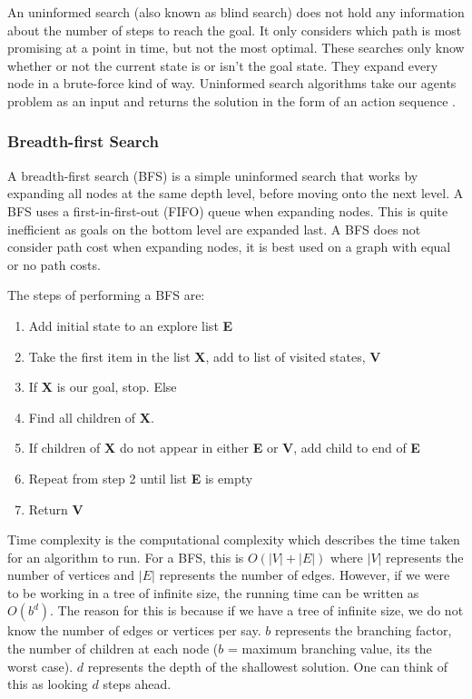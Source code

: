 \documentclass[]{final_report}
\begin{document}
An uninformed search (also known as blind search) does not hold any information about the number of steps to reach the goal. It only considers which path is most promising at a point in time, but not the most optimal\cite{pathak2018comparative}. These searches only know whether or not the current state is or isn't the goal state. They expand every node in a brute-force kind of way. Uninformed search algorithms take our agents problem as an input and returns the solution in the form of an action sequence \cite{russell2016artificial}.

\subsubsection{Breadth-first Search}\label{Breadth-first Search}

A breadth-first search (BFS) is a simple uninformed search that works by expanding all nodes at the same depth level, before moving onto the next level. A BFS uses a first-in-first-out (FIFO) queue when expanding nodes. This is quite inefficient as goals on the bottom level are expanded last. A BFS does not consider path cost when expanding nodes, it is best used on a graph with equal or no path costs.

The steps of performing a BFS are:

\begin{enumerate}
    \item Add initial state to an explore list \textbf{E}
    \item Take the first item in the list \textbf{X}, add to list of visited states, \textbf{V}
    \item If \textbf{X} is our goal, stop. Else
    \item Find all children of \textbf{X}.
    \item If children of \textbf{X} do not appear in either \textbf{E} or \textbf{V}, add child to end of \textbf{E}
    \item Repeat from step 2 until list \textbf{E} is empty
    \item Return \textbf{V}
\end{enumerate}

Time complexity is the computational complexity which describes the time taken for an algorithm to run. For a BFS, this is $O(|V| + |E|)$ where $|V|$ represents the number of vertices and $|E|$ represents the number of edges. However, if we were to be working in a tree of infinite size, the running time can be written as $O(b^d)$. The reason for this is because if we have a tree of infinite size, we do not know the number of edges or vertices per say. $b$ represents the branching factor, the number of children at each node ($b$ = maximum branching value, its the worst case). $d$ represents the depth of the shallowest solution. One can think of this as looking $d$ steps ahead.
\end{document}
